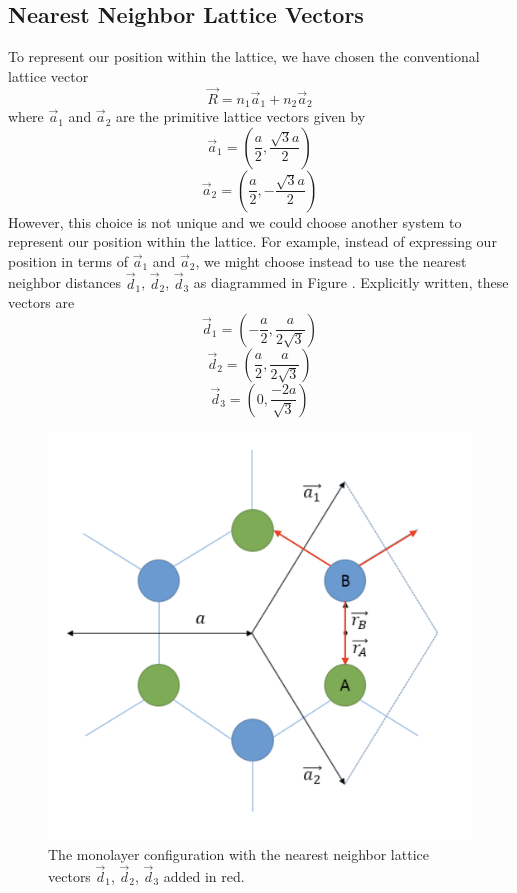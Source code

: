 \documentclass{article}
\begin{document}
\subsection{Nearest Neighbor Lattice Vectors}
To represent our position within the lattice, we have chosen the conventional lattice vector
\begin{equation}
\vec{R} = n_{1}\vec{a}_{1} + n_{2}\vec{a}_{2}
\end{equation}
where $\vec{a}_{1}$ and $\vec{a}_2$ are the primitive lattice vectors given by
$$\vec{a}_{1} = \left(\frac{a}{2}, \frac{\sqrt{3}a}{2}\right )$$
$$\vec{a}_{2} = \left(\frac{a}{2}, -\frac{\sqrt{3}a}{2}\right )$$
However, this choice is not unique and we could choose another system to represent our position within the lattice.
For example, instead of expressing our position in terms of $\vec{a}_{1}$ and $\vec{a}_{2}$, we might choose instead
to use the nearest neighbor distances $\vec{d}_{1}$, $\vec{d}_{2}$, $\vec{d}_{3}$ as diagrammed in Figure . Explicitly
written, these vectors are
$$ \vec{d}_{1} = \left(-\frac{a}{2}, \frac{a}{2\sqrt{3}}\right)$$
$$ \vec{d}_{2} = \left(\frac{a}{2}, \frac{a}{2\sqrt{3}}\right)$$
\begin{equation}
\vec{d}_{3} = \left (0, \frac{-2a}{\sqrt{3}}\right)
\end{equation}

\begin{figure}[h]
\centering
\includegraphics[scale=.42]{nearest_neighbor1}
\caption{The monolayer configuration with the nearest neighbor lattice vectors $\vec{d}_{1}$, $\vec{d}_{2}$, $\vec{d}_{3}$ added in red. }
\end{figure}
\end{document}

